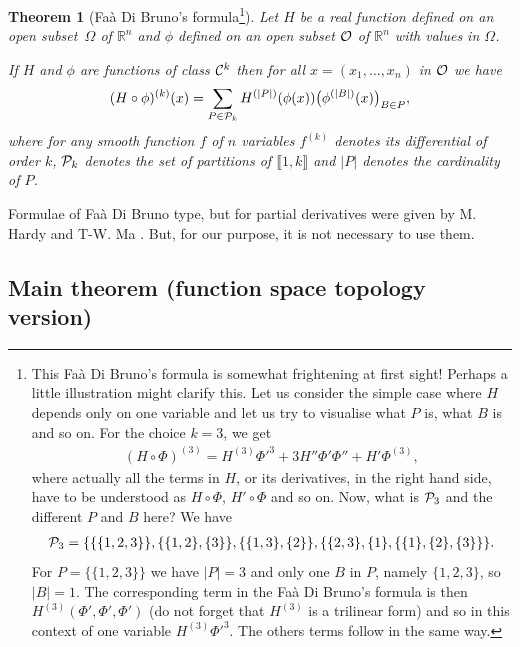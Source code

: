 \documentclass[10pt,a4paper]{amsart}
\numberwithin{equation}{section}
\newtheorem{Theorem}{Theorem}[section]
\begin{document}
\begin{Theorem}[Fa\`a Di Bruno's formula\footnote{This Fa\`a Di Bruno's formula is somewhat frightening at first sight! Perhaps a little illustration might clarify this. Let us consider the simple case where $H$ depends only on one variable and let us try to visualise what $P$ is, what $B$ is and so on. For the choice $k=3$, we get
\begin{gather*}
(H\circ\Phi)^{(3)}=H^{(3)}\Phi'^3+3H''\Phi'\Phi''+H'\Phi^{(3)},
\end{gather*}
			where actually all the terms in $H$, or its derivatives, in the right hand side, have to be understood as $H\circ\Phi$, $H'\circ\Phi$ and so on. Now, what is ${\cal P}_3$ and the different $P$ and $B$ here? We have
\begin{gather*}
{\cal P}_3=\{\{\{1,2,3\}\},\{\{1,2\},\{3\}\},\{\{1,3\},\{2\}\}, \{\{2,3\},\{1\},\{\{1\},\{2\},\{3\}\}\}.
\end{gather*}
			For $P=\{\{1,2,3\}\}$ we have $\vert P\vert=3$ and only one $B$ in $P$, namely $\{1,2,3\}$, so $\vert B\vert=1$. The corresponding term in the Fa\`a Di Bruno's formula is then $H^{(3)}(\Phi',\Phi',\Phi')$ (do not forget that $H^{(3)}$ is a trilinear form) and so in this context of one variable $H^{(3)}\Phi'^3$. The others terms follow in the same way.}]
	
	Let $H$ be a real function defined on an open subset~$\Omega$ of $\mathbb{R}^n$ and $\phi$ defined on an open subset $\cal O$ of $\mathbb{R}^n$ with values in $\Omega$.
	
	If $H$ and $\phi$ are functions of class ${\cal C}^k$ then for all $x=(x_1,\dots,x_n)$ in $\cal O$ we have
\begin{gather*}
(H\circ\phi)^{(k)}(x)=\sum_{P\in{\cal P}_k } H^{(\vert P\vert)}(\phi(x))\big(\phi^{(\vert B\vert)}(x)\big)_{B\in P},
\end{gather*}
	where for any smooth function $f$ of $n$ variables $f^{(k)}$ denotes its differential of order $k$, ${\cal P}_k$ denotes the set of partitions of $\llbracket 1,k\rrbracket $ and $\vert P\vert$ denotes the cardinality of $P$.
\end{Theorem}

Formulae of Fa\`a Di Bruno type, but for partial derivatives were given by M. Hardy \cite{Har} and T-W. Ma \cite{Ma}. But, for our purpose, it is not necessary to use them.

\subsection{Main theorem (function space topology version)}
\end{document}
